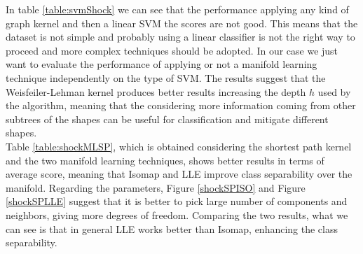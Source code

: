 \documentclass[11pt,a4paper]{article}
\begin{document}
In table \ref{table:svmShock} we can see that the performance applying any kind of graph kernel and then a linear SVM the scores are not good. This means that the dataset is not simple and probably using a linear classifier is not the right way to proceed and more complex techniques should be adopted. In our case we just want to evaluate the performance of applying or not a manifold learning technique independently on the type of SVM. The results suggest that the Weisfeiler-Lehman kernel produces better results increasing the depth $h$ used by the algorithm, meaning that the considering more information coming from other subtrees of the shapes can be useful for classification and mitigate different shapes.\\
Table \ref{table:shockMLSP}, which is obtained considering the shortest path kernel and the two manifold learning techniques, shows better results in terms of average score, meaning that Isomap and LLE improve class separability over the manifold. Regarding the parameters, Figure \ref{shockSPISO} and Figure \ref{shockSPLLE} suggest that it is better to pick large number of components and neighbors, giving more degrees of freedom. Comparing the two results, what we can see is that in general LLE works better than Isomap, enhancing the class separability.
\renewcommand{\arraystretch}{1.5}
\end{document}
